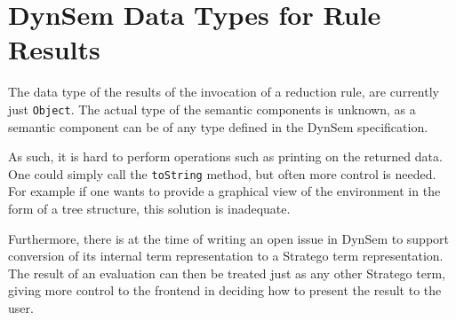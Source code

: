 \section{DynSem Data Types for Rule Results}
\label{sec:dynsem-data-repr}
The data type of the results of the invocation of a reduction rule, are
currently just \texttt{Object}. The actual type of the semantic components is
unknown, as a semantic component can be of any type defined in the DynSem
specification.

As such, it is hard to perform operations such as printing on the returned
data. One could simply call the \texttt{toString} method, but often more
control is needed. For example if one wants to provide a graphical view of the
environment in the form of a tree structure, this solution is inadequate.

Furthermore, there is at the time of writing an open issue in DynSem to support
conversion of its internal term representation to a Stratego term
representation. The result of an evaluation can then be treated just as any
other Stratego term, giving more control to the frontend in deciding how to
present the result to the user.

